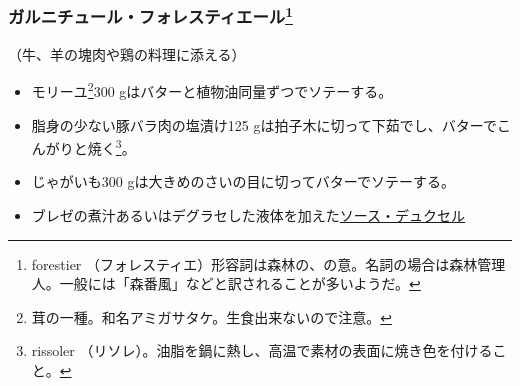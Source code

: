 \begin{recette}
\hypertarget{garniture-a-la-Forestiere}{%
\subsubsection[ガルニチュール・フォレスティエール]{\texorpdfstring{ガルニチュール・フォレスティエール\footnote{forestier
  （フォレスティエ）形容詞は森林の、の意。名詞の場合は森林管理人。一般には「森番風」などと訳されることが多いようだ。}}{ガルニチュール・フォレスティエール}}\label{garniture-a-la-Forestiere}}



（牛、羊の塊肉や鶏の料理に添える）

\begin{itemize}
\item
  モリーユ\footnote{茸の一種。和名アミガサタケ。生食出来ないので注意。}300
  gはバターと植物油同量ずつでソテーする。
\item
  脂身の少ない豚バラ肉の塩漬け125
  gは拍子木に切って下茹でし、バターでこんがりと焼く\footnote{rissoler
    （リソレ）。油脂を鍋に熱し、高温で素材の表面に焼き色を付けること。}。
\item
  じゃがいも300 gは大きめのさいの目に切ってバターでソテーする。
\item
  ブレゼの煮汁あるいはデグラセした液体を加えた\protect\hyperlink{sauce-duxelles}{ソース・デュクセル}
\end{itemize}

\hypertarget{garniture-frascati}{%
}
\end{recette}
